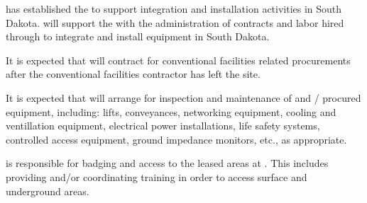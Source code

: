 \fnal has established the  to support integration and
installation activities in South Dakota.  will support the
 with the administration of contracts and labor hired
through \fnal to integrate and install equipment in South Dakota.

It is expected that  will contract for conventional
facilities related procurements after the  conventional facilities
contractor has left the site.

It is expected that  will arrange for inspection and maintenance of
 and / procured equipment, including:
lifts, conveyances, networking equipment, cooling and ventillation
equipment, electrical power installations, life safety systems,
controlled access equipment, ground impedance monitors, etc., as appropriate.

 is responsible for badging and access to the leased areas at . This
includes providing and/or coordinating  training in order to access surface and
underground areas. 


